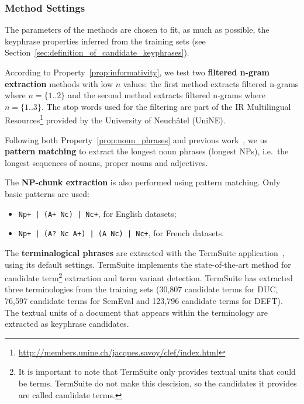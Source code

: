     \subsubsection{Method Settings}
    \label{subsubsec:method_settings}
      The parameters of the methods are chosen to fit, as much as possible, the
      keyphrase properties inferred from the training sets (see
      Section~\ref{sec:definition_of_candidate_keyphrases}).

      According to Property~\ref{prop:informativity}, we test two
      \textbf{filtered n-gram extraction} methods with low $n$ values: the first
      method extracts filtered n-grams where $n = \{1..2\}$ and the second
      method extracts filtered n-grams where $n = \{1..3\}$. The stop words used
      for the filtering are part of the IR Multilingual
      Resources\footnote{\url{http://members.unine.ch/jacques.savoy/clef/index.html}}
      provided by the University of Neuchâtel (UniNE).

      Following both Property~\ref{prop:noun_phrases} and previous
      work~\cite{hassan2010conundrums}, we us \textbf{pattern matching} to
      extract the longest noun phrases (longest NPs), i.e.~the longest sequences
      of nouns, proper nouns and adjectives.

      The \textbf{NP-chunk extraction} is also performed using pattern matching.
      Only basic patterns are used:
      \begin{itemize}
        \item{\verb:Np+ | (A+ Nc) | Nc+:, for English datasets;}
        \item{\verb:Np+ | (A? Nc A+) | (A Nc) | Nc+:, for French datasets.}
      \end{itemize}

      The \textbf{terminalogical phrases} are extracted with the TermSuite
      application~\cite{rocheteau2011termsuite}, using its default settings.
      TermSuite implements the state-of-the-art method for candidate
      term\footnote{It is important to note that TermSuite only provides textual
      units that could be terms. TermSuite do not make this descision, so the
      candidates it provides are called candidate terms.} extraction and term
      variant detection. TermSuite has extracted three terminologies from the
      training sets (30,807 candidate terms for DUC, 76,597 candidate terms for
      SemEval and 123,796 candidate terms for DEFT). The textual units of a
      document that appears within the terminology are extracted as keyphrase
      candidates.

